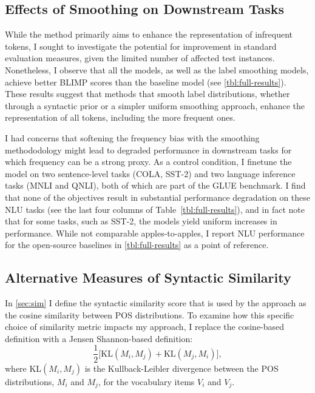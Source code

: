 \subsection{Effects of Smoothing on Downstream Tasks}
While the method primarily aims to enhance the representation of infrequent tokens, I sought to investigate the potential for improvement in standard evaluation measures, given the limited number of affected test instances. Nonetheless, I observe that all the \smoothing models, as well as the label smoothing models, achieve better BLIMP scores than the baseline model (see \cref{tbl:full-results}). These results suggest that methods that smooth label distributions, whether through a syntactic prior or a simpler uniform smoothing approach, enhance the representation of all tokens, including the more frequent ones.

I had concerns that softening the frequency bias with the smoothing methododology might lead to degraded performance in downstream tasks for which frequency can be a strong proxy. As a control condition, I finetune the model on two sentence-level tasks (COLA, SST-2) and two language inference tasks (MNLI and QNLI), both of which are part of the GLUE \citep{wang2018glue} benchmark. I find that none of the \smoothing objectives result in substantial performance degradation on these NLU tasks (see the last four columns of Table~\cref{tbl:full-results}), and in fact note that for some tasks, such as SST-2, the \smoothing models yield uniform increases in performance. While not comparable apples-to-apples, I report NLU performance for the open-source baselines in \cref{tbl:full-results} as a point of reference. 

\subsection{Alternative Measures of Syntactic Similarity}

In \cref{sec:sim} I define the syntactic similarity score that is used by the \smoothing approach as the cosine similarity between POS distributions. To examine how this specific choice of similarity metric impacts my approach, I replace the cosine-based definition with a Jensen Shannon-based definition:
$$ \frac{1}{2}\big[ \text{KL}(M_i, M_j ) + \text{KL}(M_j, M_i)\big],$$
where KL$(M_i, M_j)$ is the Kullback-Leibler divergence between the POS distributions, $M_i$ and $M_j$, for the vocabulary items $V_i$ and $V_j$.

